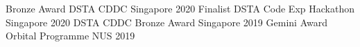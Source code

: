 



\begin{cvhonors}
  \cvhonor
  {Bronze Award} %
  {DSTA CDDC} %
  {Singapore} %
  {2020} %
  \cvhonor
  {Finalist} %
  {DSTA Code Exp Hackathon} %
  {Singapore} %
  {2020} %
  \cvhonor
  {DSTA CDDC} %
  {Bronze Award} %
  {Singapore} %
  {2019} %
  \cvhonor
  {Gemini Award} %
  {Orbital Programme} %
  {NUS} %
  {2019} %




\end{cvhonors}
